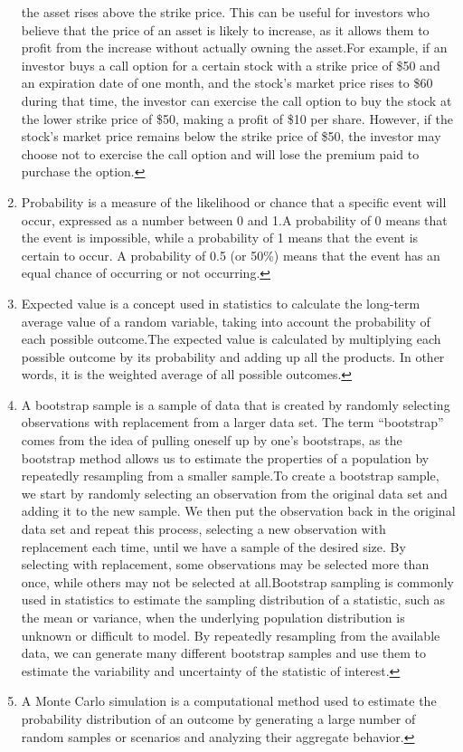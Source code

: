 \documentclass[
]{book}
\begin{document}
\begin{enumerate}
  the asset rises above the strike price. This can be useful for investors who
  believe that the price of an asset is likely to increase, as it allows them to
  profit from the increase without actually owning the asset.For example,
  if an investor buys a call option for a certain stock with a strike price of
  \$50 and an expiration date of one month, and the stock's market price rises to
  \$60 during that time, the investor can exercise the call option to buy the
  stock at the lower strike price of \$50, making a profit of \$10 per share.
  However, if the stock's market price remains below the strike price of \$50,
  the investor may choose not to exercise the call option and will lose the
  premium paid to purchase the option.\protect\hyperlink{intro}{↩︎}
\item
  Probability is a measure of the likelihood or chance that a specific event
  will occur, expressed as a number between 0 and 1.A probability of 0
  means that the event is impossible, while a probability of 1 means that the
  event is certain to occur. A probability of 0.5 (or 50\%) means that the event
  has an equal chance of occurring or not occurring.\protect\hyperlink{intro}{↩︎}
\item
  Expected value is a concept used in statistics to calculate the long-term
  average value of a random variable, taking into account the probability of each
  possible outcome.The expected value is calculated by multiplying each
  possible outcome by its probability and adding up all the products. In other
  words, it is the weighted average of all possible outcomes.\protect\hyperlink{intro}{↩︎}
\item
  A bootstrap sample is a sample of data that is created by randomly selecting
  observations with replacement from a larger data set. The term ``bootstrap'' comes
  from the idea of pulling oneself up by one's bootstraps, as the bootstrap method
  allows us to estimate the properties of a population by repeatedly resampling
  from a smaller sample.To create a bootstrap sample, we start by randomly
  selecting an observation from the original data set and adding it to the new
  sample. We then put the observation back in the original data set and repeat
  this process, selecting a new observation with replacement each time, until we
  have a sample of the desired size. By selecting with replacement, some
  observations may be selected more than once, while others may not be selected at
  all.Bootstrap sampling is commonly used in statistics to estimate the
  sampling distribution of a statistic, such as the mean or variance, when the
  underlying population distribution is unknown or difficult to model. By
  repeatedly resampling from the available data, we can generate many different
  bootstrap samples and use them to estimate the variability and uncertainty of
  the statistic of interest.\protect\hyperlink{intro}{↩︎}
\item
  A Monte Carlo simulation is a computational method used to estimate the
  probability distribution of an outcome by generating a large number of random
  samples or scenarios and analyzing their aggregate behavior.\protect\hyperlink{intro}{↩︎}
\end{enumerate}
\end{document}

